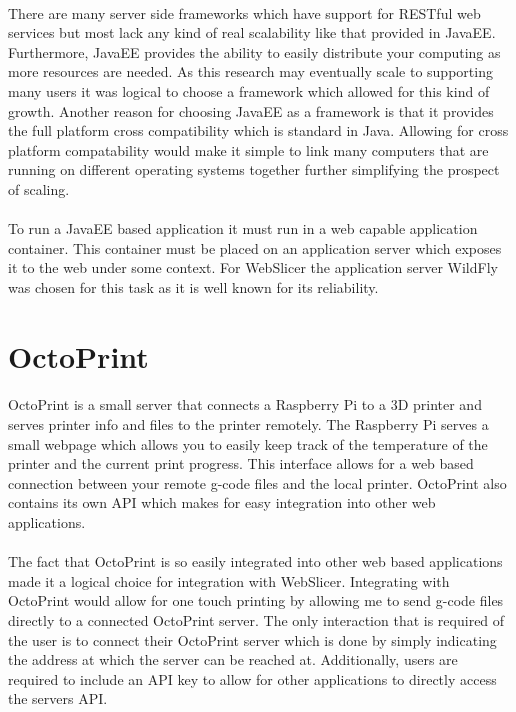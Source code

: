 \paragraph{}
There are many server side frameworks which have support for RESTful web services but most lack any kind of real scalability like that provided in JavaEE.
Furthermore, JavaEE provides the ability to easily distribute your computing as more resources are needed.
As this research may eventually scale to supporting many users it was logical to choose a framework which allowed for this kind of growth.
Another reason for choosing JavaEE as a framework is that it provides the full platform cross compatibility which is standard in Java.
Allowing for cross platform compatability would make it simple to link many computers that are running on different operating systems together further simplifying the prospect of scaling.

\paragraph{}
To run a JavaEE based application it must run in a web capable application container.
This container must be placed on an application server which exposes it to the web under some context.
For WebSlicer the application server WildFly was chosen for this task as it is well known for its reliability.

\section{OctoPrint}
\paragraph{}
OctoPrint is a small server that connects a Raspberry Pi to a 3D printer and serves printer info and files to the printer remotely.
The Raspberry Pi serves a small webpage which allows you to easily keep track of the temperature of the printer and the current print progress.
This interface allows for a web based connection between your remote g-code files and the local printer. \cite{mastering3Dprinting}
OctoPrint also contains its own API which makes for easy integration into other web applications.

\paragraph{}
The fact that OctoPrint is so easily integrated into other web based applications made it a logical choice for integration with WebSlicer.
Integrating with OctoPrint would allow for one touch printing by allowing me to send g-code files directly to a connected OctoPrint server.
The only interaction that is required of the user is to connect their OctoPrint server which is done by simply indicating the address at which the server can be reached at.
Additionally, users are required to include an API key to allow for other applications to directly access the servers API.
 
